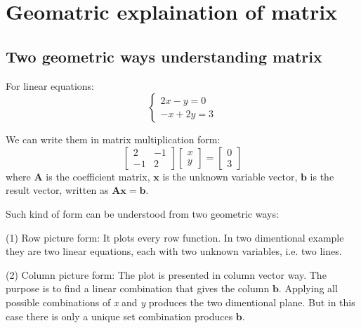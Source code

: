 \documentclass{article}
\begin{document}
\section{Geomatric explaination of matrix}

\subsection{Two geometric ways understanding matrix}

For linear equations:
\begin{equation}
\label{eq:3}
\left\{
\begin{array}{cc}
2x-y=0\\
-x+2y=3
\end{array}\right.
\end{equation}

We can write them in matrix multiplication form:
\begin{equation}
\label{eq:2}
\left[ \begin{array}{cc}
2 & -1\\
-1 & 2
\end{array} \right]
\left[ \begin{array}{c}
x\\y
\end{array} \right] = \left[ \begin{array}{c}
0\\3
\end{array} \right] 
\end{equation}
where  $\boldsymbol{A}$ is the coefficient matrix, $\boldsymbol{x}$ is the
unknown variable vector, $\boldsymbol{b}$ is the result vector, written as $\boldsymbol{Ax=b}$.

Such kind of form can be understood from two geometric ways:

(1) Row picture form:
It plots every row function. In two dimentional example they are two linear
equations, each with two unknown variables, i.e. two lines.

(2) Column picture form:
The plot is presented in column vector way. The purpose is to find a linear
combination that gives the column $\boldsymbol{b}$. Applying all possible
combinations of \textit{x} and \textit{y} produces the two dimentional plane.
But in this case there is only a unique set combination produces $\boldsymbol{b}$.
\end{document}
